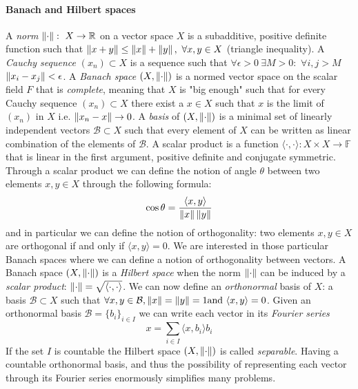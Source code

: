 \paragraph{Banach and Hilbert spaces}
A \textit{norm} $\left\lVert\cdot\right\rVert:\ X\to\mathbb R$ on a vector space $X$ is a subadditive, positive definite function such that $\left\lVert x+y\right\rVert\leq\left\lVert x\right\rVert +\left\lVert y\right\rVert,\ \forall x,y\in X$ (triangle inequality). A \textit{Cauchy sequence} $(x_n)\subset X$ is a sequence such that $\forall \epsilon>0\  \exists M>0: $ $\forall i,j>M$ $ \left\lVert x_i-x_j\right\rVert<\epsilon$. A \textit{Banach space} $(X, \left\lVert\cdot\right\rVert)$ is a normed vector space on the scalar field $F$ that is \textit{complete}, meaning that $X$ is "big enough" such that for every Cauchy sequence $(x_n)\subset X$ there exist a $x\in X$ such that $x$ is the limit of $(x_n)$ in $X$ i.e. $\left\lVert x_n-x\right\rVert\rightarrow 0$. A \textit{basis} of $(X, \left\lVert\cdot\right\rVert)$ is a minimal set of linearly independent vectors $\mathcal B \subset X$ such that every element of $X$ can be written as linear combination of the elements of $\mathcal B$. A scalar product is a function $\langle\cdot,\cdot\rangle: X\times X \rightarrow \mathbb F$ that is linear in the first argument, positive definite and conjugate symmetric. Through a scalar product we can define the notion of angle $\theta$ between two elements $x, y \in X$ through the following formula: 
$$
\cos \theta = \frac{\langle x, y\rangle}{\left\lVert x\right\rVert \left\lVert y\right\rVert}
$$ 
and in particular we can define the notion of orthogonality: two elements  $x, y \in X$ are orthogonal if and only if $\langle x, y\rangle=0$. We are interested in those particular Banach spaces where we can define a notion of orthogonality between vectors. A Banach space $(X, \left\lVert\cdot\right\rVert )$ is a \textit{Hilbert space} when the norm $ \left\lVert\cdot\right\rVert $ can be induced by a \textit{scalar product}: $\left\lVert\cdot\right\rVert = \sqrt{\langle\cdot,\cdot\rangle}$. We can now define an \textit{orthonormal} basis of $X$: a basis $\mathcal B \subset X$ such that $\forall x, y \in \mathcal B, \left\lVert x\right\rVert = \left\lVert y\right\rVert = 1 \text{and } \langle x, y\rangle = 0$. Given an orthonormal basis $\mathcal B = \{b_i\}_{i\in I}$ we can write each vector in its \textit{Fourier series} 
\begin{equation}\label{eq:abstract fourier}
x = \sum_{i\in I} \langle x, b_i\rangle b_i
\end{equation}
If the set $I$ is countable the Hilbert space $(X, \left\lVert\cdot\right\rVert)$ is called \textit{separable}. Having a countable orthonormal basis, and thus the possibility of representing each vector through its Fourier series enormously simplifies many problems.
